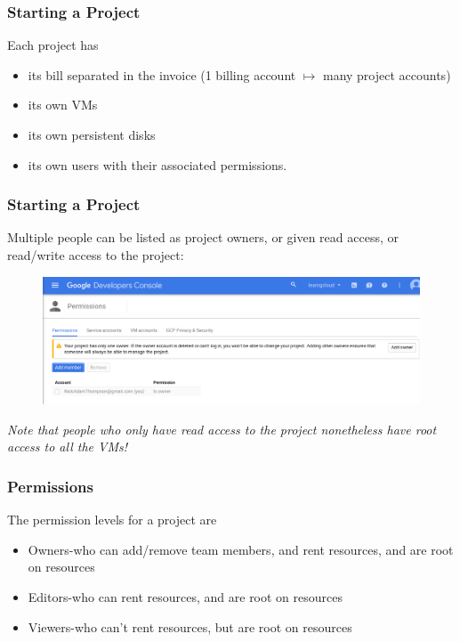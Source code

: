 \documentclass[9pt]{beamer}
\begin{document}
\begin{frame}[fragile]
  \frametitle{Starting a Project}
  Each project has
  \pause
  \begin{itemize}
  \item its bill separated in the invoice (1 billing account $\mapsto$ many project accounts)
    \pause
  \item its own VMs
    \pause
  \item its own persistent disks
    \pause
  \item its own users with their associated permissions.
  \end{itemize}
\end{frame}

\begin{frame}[fragile]
  \frametitle{Starting a Project}
  Multiple people can be listed as project owners, or given read access, or read/write access to the project:
  \begin{figure}
    \includegraphics[scale=0.2]{figures/AddProjectOwner.png}
  \end{figure}
  \emph{Note that people who only have read access to the project nonetheless have root access to all the VMs!}
\end{frame}

\begin{frame}[fragile]
  \frametitle{Permissions}
  The permission levels for a project are
  \begin{itemize}
    \item Owners-who can add/remove team members, and rent resources, and are root on resources
    \item Editors-who can rent resources, and are root on resources
    \item Viewers-who can't rent resources, but are root on resources
  \end{itemize}
\end{frame}
\end{document}
